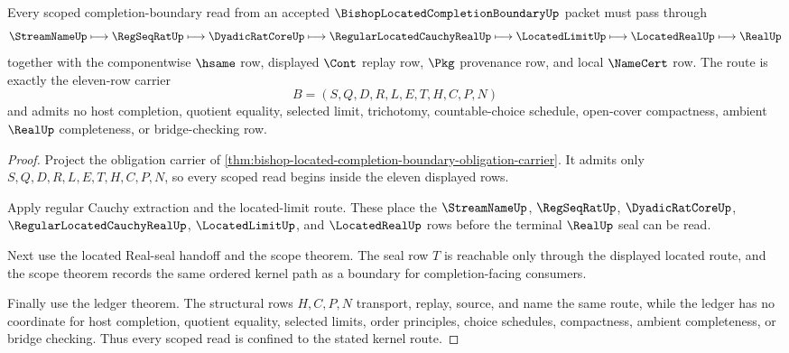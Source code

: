 \begin{theorem}
\label{thm:bishop-located-completion-boundary-scoped-route}
Every scoped completion-boundary read from an accepted $\BishopLocatedCompletionBoundaryUp$ packet must pass through
$$
\StreamNameUp \longmapsto \RegSeqRatUp \longmapsto \DyadicRatCoreUp \longmapsto \RegularLocatedCauchyRealUp \longmapsto \LocatedLimitUp \longmapsto \LocatedRealUp \longmapsto \RealUp
$$
together with the componentwise $\hsame$ row, displayed $\Cont$ replay row, $\Pkg$ provenance row, and local $\NameCert$ row. The route is exactly the eleven-row carrier
$$
B=(S,Q,D,R,L,E,T,H,C,P,N)
$$
and admits no host completion, quotient equality, selected limit, trichotomy, countable-choice schedule, open-cover compactness, ambient $\RealUp$ completeness, or bridge-checking row.
\end{theorem}
\begin{proof}
Project the obligation carrier of \autoref{thm:bishop-located-completion-boundary-obligation-carrier}. It admits only $S,Q,D,R,L,E,T,H,C,P,N$, so every scoped read begins inside the eleven displayed rows.

Apply regular Cauchy extraction and the located-limit route. These place the $\StreamNameUp$, $\RegSeqRatUp$, $\DyadicRatCoreUp$, $\RegularLocatedCauchyRealUp$, $\LocatedLimitUp$, and $\LocatedRealUp$ rows before the terminal $\RealUp$ seal can be read.

Next use the located Real-seal handoff and the scope theorem. The seal row $T$ is reachable only through the displayed located route, and the scope theorem records the same ordered kernel path as a boundary for completion-facing consumers.

Finally use the ledger theorem. The structural rows $H,C,P,N$ transport, replay, source, and name the same route, while the ledger has no coordinate for host completion, quotient equality, selected limits, order principles, choice schedules, compactness, ambient completeness, or bridge checking. Thus every scoped read is confined to the stated kernel route.
\end{proof}

